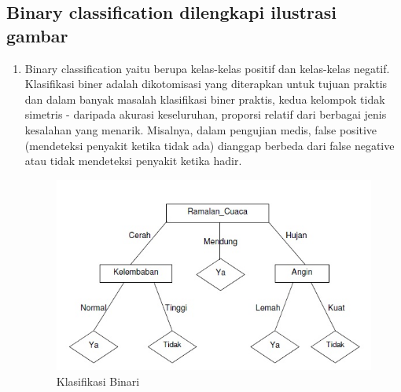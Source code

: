 \subsection{Binary classification dilengkapi ilustrasi gambar}
\begin{enumerate}
\item Binary classification yaitu berupa kelas-kelas positif dan kelas-kelas negatif. Klasifikasi biner adalah dikotomisasi yang diterapkan untuk tujuan praktis dan dalam banyak masalah klasifikasi biner praktis, kedua kelompok tidak simetris - daripada akurasi keseluruhan, proporsi relatif dari berbagai jenis kesalahan yang menarik. Misalnya, dalam pengujian medis, false positive (mendeteksi penyakit ketika tidak ada) dianggap berbeda dari false negative atau tidak mendeteksi penyakit ketika hadir.
\begin{figure}[ht]
\centering
\includegraphics[scale=0.5]{figures/1mrdt.jpg}
\caption{Klasifikasi Binari}
\label{contoh}
\end{figure}
\end{enumerate}


